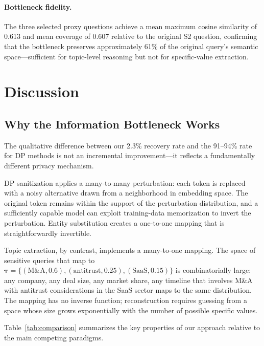 \documentclass[sigconf,anonymous,review,balance=false]{acmart}
\begin{document}
\paragraph{Bottleneck fidelity.} The three selected proxy questions achieve a mean maximum cosine similarity of 0.613 and mean coverage of 0.607 relative to the original S2 question, confirming that the bottleneck preserves approximately 61\% of the original query's semantic space---sufficient for topic-level reasoning but not for specific-value extraction.

\section{Discussion}
\label{sec:discussion}

\subsection{Why the Information Bottleneck Works}
\label{sec:why-works}

The qualitative difference between our 2.3\% recovery rate and the 91--94\% rate for DP methods is not an incremental improvement---it reflects a fundamentally different privacy mechanism.

DP sanitization applies a many-to-many perturbation: each token is replaced with a noisy alternative drawn from a neighborhood in embedding space. The original token remains within the support of the perturbation distribution, and a sufficiently capable model can exploit training-data memorization to invert the perturbation. Entity substitution creates a one-to-one mapping that is straightforwardly invertible.

Topic extraction, by contrast, implements a many-to-one mapping. The space of sensitive queries that map to $\boldsymbol{\tau} = \{(\text{M\&A}, 0.6), (\text{antitrust}, 0.25), (\text{SaaS}, 0.15)\}$ is combinatorially large: any company, any deal size, any market share, any timeline that involves M\&A with antitrust considerations in the SaaS sector maps to the same distribution. The mapping has no inverse function; reconstruction requires guessing from a space whose size grows exponentially with the number of possible specific values.

Table~\ref{tab:comparison} summarizes the key properties of our approach relative to the main competing paradigms.
\end{document}
